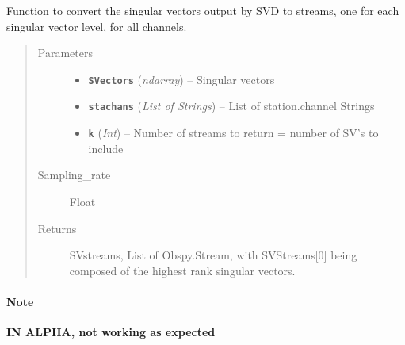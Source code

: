 \documentclass[a4paper,10pt,english]{sphinxmanual}
\begin{document}
\begin{fulllineitems}
\label{utils:clustering.SVD_2_stream_testing}
Function to convert the singular vectors output by SVD to streams, one for
each singular vector level, for all channels.
\begin{quote}\begin{description}
\item[{Parameters}] \leavevmode\begin{itemize}
\item {} 
\textbf{\texttt{SVectors}} (\emph{ndarray}) -- Singular vectors

\item {} 
\textbf{\texttt{stachans}} (\emph{List of Strings}) -- List of station.channel Strings

\item {} 
\textbf{\texttt{k}} (\emph{Int}) -- Number of streams to return = number of SV's to include

\end{itemize}

\item[{Sampling\_rate}] \leavevmode
Float

\item[{Returns}] \leavevmode
SVstreams, List of Obspy.Stream, with SVStreams{[}0{]} being
composed of the highest rank singular vectors.

\end{description}\end{quote}
\paragraph{Note}

\textbf{IN ALPHA, not working as expected}

\end{fulllineitems}

\end{document}
